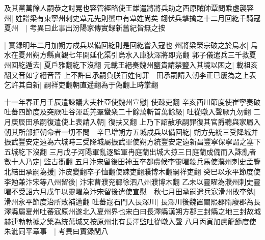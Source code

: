 及其黨萬餘人嗣恭之討晃也容管經略使王雄遣將將兵助之西原賊帥覃問乘虛襲容州|{
	姓譜梁有東寧州刺史覃元先則蠻中有覃姓尚矣}
翃伏兵擊擒之十二月回紇千騎寇夏州　|{
	考異曰此事出汾陽家傳實録新舊紀皆無之按}


|{
	實録明年二月加朔方戍兵以備回紇則是回紇嘗入寇也}
州將梁榮宗破之於烏水|{
	烏水在夏州朔方縣貞觀七年開延化渠引烏水入庫狄澤將即亮翻}
郭子儀遣兵三千救夏州回紇遁去|{
	夏戶雅翻紇下沒翻}
元載王縉奏魏州鹽貴請禁鹽入其境以困之|{
	載祖亥翻又音如字縉音晉}
上不許曰承嗣負朕百姓何罪　田承嗣請入朝李正已屢為之上表乞許其自新|{
	嗣祥吏翻朝直遥翻為于偽翻上時掌翻}


十一年春正月壬辰遣諫議大夫杜亞使魏州宣慰|{
	使疎吏翻}
辛亥西川節度使崔寧奏破吐蕃四節度及突厥吐谷渾氐羌羣蠻衆二十餘萬斬首萬餘級|{
	吐從暾入聲厥九勿翻}
二月庚辰田承嗣復遣使上表請入朝|{
	復扶又翻}
上乃下詔赦承嗣罪復其官爵聽與家屬入朝其所部拒朝命者一切不問　辛巳增朔方五城戍兵以備回紇|{
	朔方先統三受降城并振武豐安定遠為六城時三受降城屬振武軍使朔方統豐安定遠新昌豐寧保寧謂之塞下五城紇下沒翻}
三月戊子河陽軍亂逐監軍冉庭蘭出城大掠三日庭蘭成備而入誅亂者數十人乃定|{
	監古銜翻}
五月汴宋留後田神玉卒都虞候李靈曜殺兵馬使濮州刺史孟鑒北結田承嗣為援|{
	汴皮變翻卒子恤翻使踈吏翻濮博木翻嗣祥吏翻}
癸巳以永平節度使李勉兼汴宋等八州留後|{
	汴宋曹濮兖鄆徐泗八州濮博木翻}
乙未以靈曜為濮州刺史靈曜不受詔六月戊午以靈曜為汴宋留後遣使宣慰　秋七月田承嗣遣兵寇滑州敗李勉|{
	滑州永平節度治所敗補邁翻}
吐蕃寇石門入長澤川|{
	長澤川後魏置闡熙郡隋廢郡為長澤縣屬夏州吐蕃寇原州遂北入夏州界也宋白曰長澤縣漢朔方郡三封縣之地三封故城赫連勃勃據之築為統萬城又按原州北有長澤監吐從暾入聲}
八月丙寅加盧龍節度使朱泚同平章事　|{
	考異曰實録閏八}


